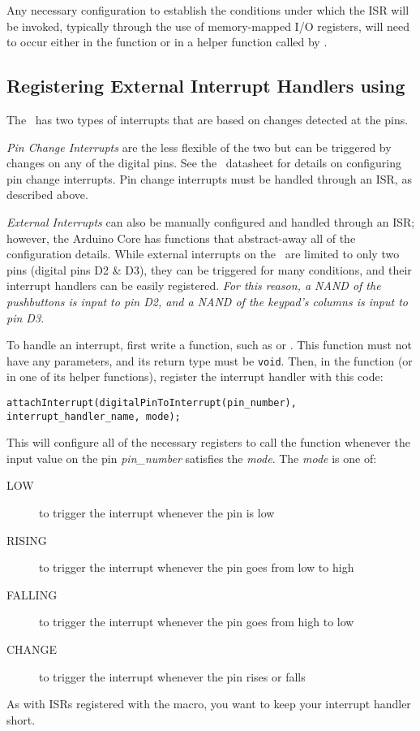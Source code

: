 Any necessary configuration to establish the conditions under which the ISR will be invoked, typically through the use of memory-mapped I/O registers, will need to occur either in the  function or in a helper function called by .

\subsection{Registering External Interrupt Handlers using }

The \microcontroller\ has two types of interrupts that are based on changes detected at the pins.

\textit{Pin Change Interrupts} are the less flexible of the two but can be triggered by changes on any of the digital pins.
See the \microcontroller\ datasheet\cite{ATmega328P} for details on configuring pin change interrupts.
Pin change interrupts must be handled through an ISR, as described above.

\textit{External Interrupts} can also be manually configured\cite{ATmega328P} and handled through an ISR;
however, the Arduino Core has functions that abstract-away all of the configuration details.\cite{arduinoInterrupt}
While external interrupts on the \microcontroller\ are limited to only two pins (digital pins D2 \& D3), they can be triggered for many conditions, and their interrupt handlers can be easily registered.
\textit{For this reason, a NAND of the pushbuttons is input to pin D2, and a NAND of the keypad's columns is input to pin D3.}

To handle an interrupt, first write a function, such as  or .
This function must not have any parameters, and its return type must be \lstinline{void}.
Then, in the  function (or in one of its helper functions), register the interrupt handler with this code:
\begin{lstlisting}[basicstyle=\small]
attachInterrupt(digitalPinToInterrupt(pin_number), interrupt_handler_name, mode);
\end{lstlisting}
This will configure all of the necessary registers to call the function  whenever the input value on the pin \textit{pin\_number} satisfies the \textit{mode}.
The \textit{mode} is one of:
\begin{description}
    \item [LOW] to trigger the interrupt whenever the pin is low
    \item [RISING] to trigger the interrupt whenever the pin goes from low to
    high
    \item [FALLING] to trigger the interrupt whenever the pin goes from high to
    low
    \item [CHANGE] to trigger the interrupt whenever the pin rises or falls
\end{description}

As with ISRs registered with the  macro, you want to keep your interrupt handler short.


